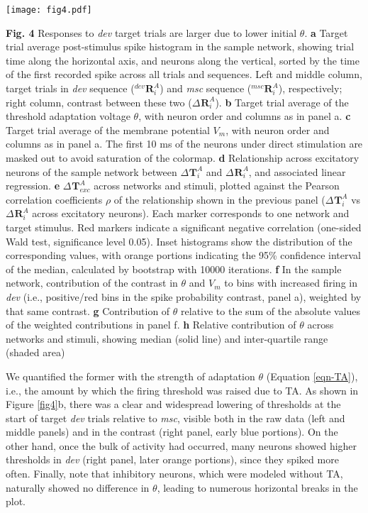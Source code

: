 \documentclass[pdflatex,referee,iicol,sn-basic]{sn-jnl}
\newcommand{\dev}{\textit{dev}}
\newcommand{\msc}{\textit{msc}}
\renewcommand{\R}[3][]{{}^{#1}_{}\!\mathbf{R}^{#2}_{#3}}
\renewcommand{\T}[3][]{{}^{#1}_{}\mathbf{T}^{#2}_{#3}}
\theoremstyle{thmstyleone}%
\theoremstyle{thmstyletwo}%
\theoremstyle{thmstylethree}%
\begin{document}
\begin{figure*}%
    \centering
    \texttt{[image: fig4.pdf]}
    \caption{}
    \label{fig4}
\end{figure*}
\textbf{Fig. 4} Responses to \dev{} target trials are larger due to lower initial $\theta$.
\textbf{a} Target trial average post-stimulus spike histogram in the sample network, showing trial time along the horizontal axis, and neurons along the vertical, sorted by the time of the first recorded spike across all trials and sequences. Left and middle column, target trials in \dev{} sequence ($\R[dev]{A}{i}$) and \msc{} sequence ($\R[msc]{A}{i}$), respectively; right column, contrast between these two ($\Delta \R{A}{i}$).
\textbf{b} Target trial average of the threshold adaptation voltage $\theta$, with neuron order and columns as in panel a.
\textbf{c} Target trial average of the membrane potential $V_m$, with neuron order and columns as in panel a. The first 10 ms of the neurons under direct stimulation are masked out to avoid saturation of the colormap.
\textbf{d} Relationship across excitatory neurons of the sample network between $\Delta \T{A}{i}$ and $\Delta \R{A}{i}$, and associated linear regression.
\textbf{e} $\Delta \T{A}{exc}$ across networks and stimuli, plotted against the Pearson correlation coefficients $\rho$ of the relationship shown in the previous panel ($\Delta \T{A}{i}$ vs $\Delta \R{A}{i}$ across excitatory neurons). Each marker corresponds to one network and target stimulus. Red markers indicate a significant negative correlation (one-sided Wald test, significance level 0.05). Inset histograms show the distribution of the corresponding values, with orange portions indicating the 95\% confidence interval of the median, calculated by bootstrap with 10000 iterations.
\textbf{f} In the sample network, contribution of the contrast in $\theta$ and $V_m$ to bins with increased firing in \dev{} (i.e., positive/red bins in the spike probability contrast, panel a), weighted by that same contrast.
\textbf{g} Contribution of $\theta$ relative to the sum of the absolute values of the weighted contributions in panel f.
\textbf{h} Relative contribution of $\theta$ across networks and stimuli, showing median (solid line) and inter-quartile range (shaded area)

We quantified the former with the strength of adaptation $\theta$ (Equation \ref{eqn-TA}), i.e., the amount by which the firing threshold was raised due to TA. As shown in Figure \ref{fig4}b, there was a clear and widespread lowering of thresholds at the start of target \dev{} trials relative to \msc{}, visible both in the raw data (left and middle panels) and in the contrast (right panel, early blue portions). On the other hand, once the bulk of activity had occurred, many neurons showed higher thresholds in \dev{} (right panel, later orange portions), since they spiked more often. Finally, note that inhibitory neurons, which were modeled without TA, naturally showed no difference in $\theta$, leading to numerous horizontal breaks in the plot.
\end{document}
